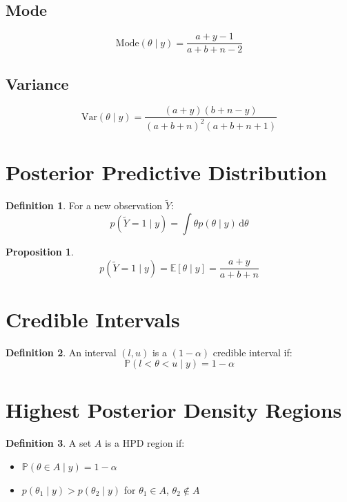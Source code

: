 \documentclass[12pt,oneside]{book}
\numberwithin{equation}{section}
\theoremstyle{definition}
\newtheorem{definition}{Definition}[section]
\theoremstyle{plain}
\newtheorem{proposition}{Proposition}[section]
\theoremstyle{remark}
\newcommand{\E}{\mathbb{E}}
\newcommand{\Var}{\mathrm{Var}}
\newcommand{\Prob}{\mathbb{P}}
\newcommand{\dd}{\,\mathrm{d}}
\begin{document}
\subsection{Mode}

$$
\text{Mode}(\theta \mid y) =
\frac{a+y-1}{a+b+n-2}
$$

\subsection{Variance}

$$
\Var(\theta \mid y)
=
\frac{(a+y)(b+n-y)}{(a+b+n)^2(a+b+n+1)}
$$

\section{Posterior Predictive Distribution}

\begin{definition}
For a new observation $\tilde{Y}$:
$$
p(\tilde{Y}=1 \mid y)
=
\int \theta p(\theta \mid y)\dd \theta
$$
\end{definition}

\begin{proposition}
$$
p(\tilde{Y}=1 \mid y) = \E[\theta \mid y] = \frac{a+y}{a+b+n}
$$
\end{proposition}

\section{Credible Intervals}

\begin{definition}
An interval $(l,u)$ is a $(1-\alpha)$ credible interval if:
$$
\Prob(l < \theta < u \mid y) = 1-\alpha
$$
\end{definition}

\section{Highest Posterior Density Regions}

\begin{definition}
A set $A$ is a HPD region if:
\begin{itemize}
\item $\Prob(\theta \in A \mid y) = 1-\alpha$
\item $p(\theta_1 \mid y) > p(\theta_2 \mid y)$ for $\theta_1 \in A$, $\theta_2 \notin A$
\end{itemize}
\end{definition}
\end{document}
